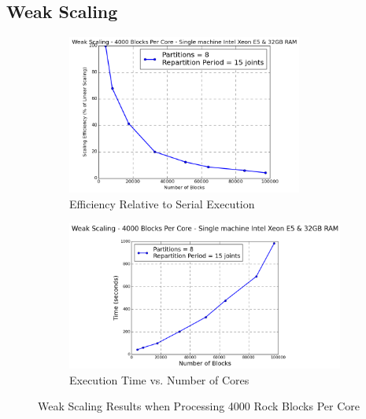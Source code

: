 \subsection{Weak Scaling}
\begin{figure}[t]
\centering
\begin{subfigure}{0.5\textwidth}
    \centering
    \includegraphics[width=0.85\textwidth]{weakScalingEfficiency.png}
    \caption{Efficiency Relative to Serial Execution}
\end{subfigure}%
\begin{subfigure}{0.5\textwidth}
    \centering
    \includegraphics[width=\textwidth]{weakScalingTime.png}
    \caption{Execution Time vs. Number of Cores}
\end{subfigure}
\caption{Weak Scaling Results when Processing 4000 Rock Blocks Per Core}
\label{fig:weakScaling}
\end{figure}

